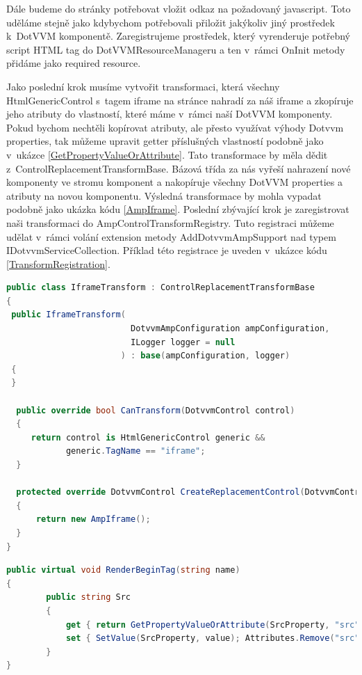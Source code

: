 Dále budeme do stránky potřebovat vložit odkaz na požadovaný javascript. Toto uděláme stejně jako kdybychom potřebovali přiložit jakýkoliv jiný prostředek k~DotVVM komponentě. Zaregistrujeme prostředek, který vyrenderuje potřebný script HTML tag do DotVVMResourceManageru a ten v~rámci OnInit metody přidáme jako required resource.

Jako poslední krok musíme vytvořit transformaci, která všechny HtmlGenericControl s~tagem iframe na stránce nahradí za náš iframe a zkopíruje jeho atributy do vlastností, které máme v~rámci naší DotVVM komponenty. Pokud bychom nechtěli kopírovat atributy, ale přesto využívat výhody Dotvvm properties, tak můžeme upravit getter příslušných vlastností podobně jako v~ukázce \ref{GetPropertyValueOrAttribute}.  Tato transformace by měla dědit z~ControlReplacementTransformBase. Bázová třída za nás vyřeší nahrazení nové komponenty ve stromu komponent a nakopíruje všechny DotVVM properties a atributy na novou komponentu. Výsledná transformace by mohla vypadat podobně jako ukázka kódu  \ref{AmpIframe}. Poslední zbývající krok je zaregistrovat naši transformaci do AmpControlTransformRegistry. Tuto registraci můžeme udělat v~rámci volání extension metody AddDotvvmAmpSupport nad typem IDotvvmServiceCollection. Příklad této registrace je uveden v~ukázce kódu \ref{TransformRegistration}.
\begin{lstlisting}[language=c#, caption=Ukázka možné implementace tranformace pro iframe,label=AmpIframe,captionpos=t]
public class IframeTransform : ControlReplacementTransformBase
{
 public IframeTransform(
                         DotvvmAmpConfiguration ampConfiguration,
                         ILogger logger = null
                       ) : base(ampConfiguration, logger)
 {
 }

  public override bool CanTransform(DotvvmControl control)
  {
     return control is HtmlGenericControl generic &&
            generic.TagName == "iframe";
  }

  protected override DotvvmControl CreateReplacementControl(DotvvmControl control)
  {
      return new AmpIframe();
  }
}
\end{lstlisting}

\begin{lstlisting}[language=c#, caption=Možný způsob jak se vyhnout kopírování HTML atributů do DotVVM property.r ,label=GetPropertyValueOrAttribute,captionpos=t]
public virtual void RenderBeginTag(string name)
{
        public string Src
        {
            get { return GetPropertyValueOrAttribute(SrcProperty, "src"); }
            set { SetValue(SrcProperty, value); Attributes.Remove("src"); }
        }
}
\end{lstlisting}

